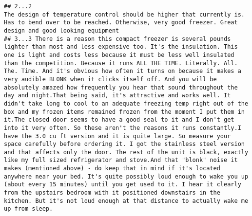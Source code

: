 \documentclass[
  11pt,
]{article}
\begin{document}
\begin{verbatim}
## 2...2                                                                                                                                                                                                                                                                                                                                                                                                                                                                                                                                                                                                                                                                                                                                                                                                                                                                                                                                                                                                                                                                                                                                                                                                                                                                                                          The design of temperature control should be higher that currently is. Has to bend over to be reached. Otherwise, very good freezer. Great design and good looking equipment
## 3...3 There is a reason this compact freezer is several pounds lighter than most and less expensive too. It's the insulation. This one is light and costs less because it must be less well insulated than the competition. Because it runs ALL THE TIME. Literally. All. The. Time. And it's obvious how often it turns on because it makes a very audible BLONK when it clicks itself off. And you will be absolutely amazed how frequently you hear that sound throughout the day and night.That being said, it's attractive and works well. It didn't take long to cool to an adequate freezing temp right out of the box and my frozen items remained frozen from the moment I put them in it.The closed door seems to have a good seal to it and I don't get into it very often. So these aren't the reasons it runs constantly.I have the 3.0 cu ft version and it is quite large. So measure your space carefully before ordering it. I got the stainless steel version and that affects only the door. The rest of the unit is black, exactly like my full sized refrigerator and stove.And that "blonk" noise it makes (mentioned above) - do keep that in mind if it's located anywhere near your bed. It's quite possibly loud enough to wake you up (about every 15 minutes) until you get used to it. I hear it clearly from the upstairs bedroom with it positioned downstairs in the kitchen. But it's not loud enough at that distance to actually wake me up from sleep.

\end{verbatim}
\end{document}
